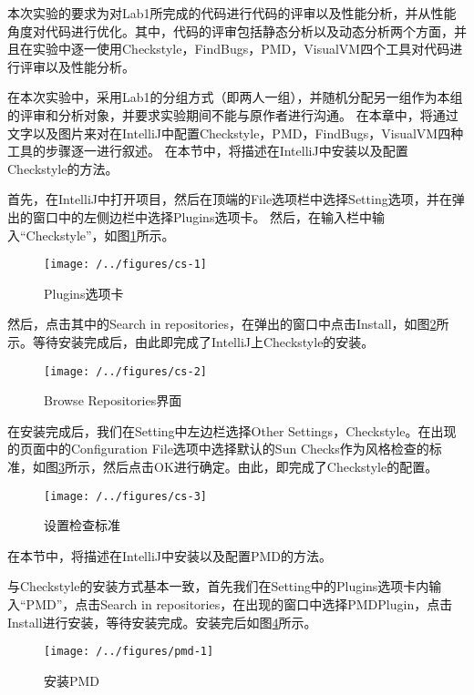 
本次实验的要求为对Lab1所完成的代码进行代码的评审以及性能分析，并从性能角度对代码进行优化。其中，代码的评审包括静态分析以及动态分析两个方面，并且在实验中逐一使用Checkstyle，FindBugs，PMD，VisualVM四个工具对代码进行评审以及性能分析。

在本次实验中，采用Lab1的分组方式（即两人一组），并随机分配另一组作为本组的评审和分析对象，并要求实验期间不能与原作者进行沟通。
在本章中，将通过文字以及图片来对在IntelliJ中配置Checkstyle，PMD，FindBugs，VisualVM四种工具的步骤逐一进行叙述。
在本节中，将描述在IntelliJ中安装以及配置Checkstyle的方法。

首先，在IntelliJ中打开项目，然后在顶端的File选项栏中选择Setting选项，并在弹出的窗口中的左侧边栏中选择Plugins选项卡。
然后，在输入栏中输入“Checkstyle”，如图\ref{fig:cs-1}所示。

\begin{figure}
\centering
\texttt{[image: /../figures/cs-1]}
\caption{Plugins选项卡}
\label{fig:cs-1}
\end{figure}

然后，点击其中的Search in repositories，在弹出的窗口中点击Install，如图\ref{fig:cs-2}所示。等待安装完成后，由此即完成了IntelliJ上Checkstyle的安装。

\begin{figure}
\centering
\texttt{[image: /../figures/cs-2]}
\caption{Browse Repositories界面}
\label{fig:cs-2}
\end{figure}

在安装完成后，我们在Setting中左边栏选择Other Settings，Checkstyle。在出现的页面中的Configuration File选项中选择默认的Sun Checks作为风格检查的标准，如图\ref{fig:cs-3}所示，然后点击OK进行确定。由此，即完成了Checkstyle的配置。
\begin{figure}
\centering
\texttt{[image: /../figures/cs-3]}
\caption{设置检查标准}
\label{fig:cs-3}
\end{figure}

在本节中，将描述在IntelliJ中安装以及配置PMD的方法。

与Checkstyle的安装方式基本一致，首先我们在Setting中的Plugins选项卡内输入“PMD”，点击Search in repositories，在出现的窗口中选择PMDPlugin，点击Install进行安装，等待安装完成。安装完后如图\ref{fig:pmd-1}所示。

\begin{figure}
\centering
\texttt{[image: /../figures/pmd-1]}
\caption{安装PMD}
\label{fig:pmd-1}
\end{figure}

